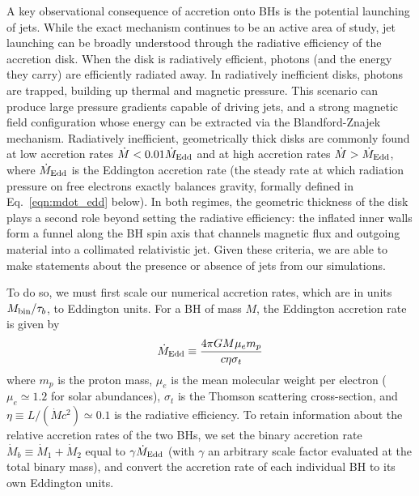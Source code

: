 \documentclass[fleqn,usenatbib]{mnras}
\begin{document}
A key observational consequence of accretion onto BHs is the potential launching of jets. While the exact mechanism continues to be an active area of study, jet launching can be broadly understood through the radiative efficiency of the accretion disk. When the disk is radiatively efficient, photons (and the energy they carry) are efficiently radiated away. In radiatively inefficient disks, photons are trapped, building up thermal and magnetic pressure. This scenario can produce large pressure gradients capable of driving jets, and a strong magnetic field configuration whose energy can be extracted via the Blandford-Znajek mechanism. Radiatively inefficient, geometrically thick disks are commonly found at low accretion rates $\dot{M} < 0.01 \dot{M}_{\rm Edd}$ \citep{Muryel_lowedd_jet_21} and at high accretion rates $\dot{M} > \dot{M}_{\rm Edd}$, where $\dot{M}_{\rm Edd}$ is the Eddington accretion rate (the steady rate at which radiation pressure on free electrons exactly balances gravity, formally defined in Eq.~\ref{eqn:mdot_edd} below). In both regimes, the geometric thickness of the disk plays a second role beyond setting the radiative efficiency: the inflated inner walls form a funnel along the BH spin axis that channels magnetic flux and outgoing material into a collimated relativistic jet. Given these criteria, we are able to make statements about the presence or absence of jets from our simulations.


To do so, we must first scale our numerical accretion rates, which are in units $M_{\rm{bin}}/\tau_b$, to Eddington units. For a BH of mass $M$, the Eddington accretion rate is given by
\begin{equation}\label{eqn:mdot_edd}
    \dot{M}_{\rm Edd} \equiv \frac{4\pi GM \mu_e m_p}{c \eta \sigma_t}
\end{equation}
where $m_p$ is the proton mass, $\mu_e$ is the mean molecular weight per electron ($\mu_e \simeq 1.2$ for solar abundances), $\sigma_t$ is the Thomson scattering cross-section, and $\eta \equiv L/(\dot{M}c^2) \simeq 0.1$ is the radiative efficiency. To retain information about the relative accretion rates of the two BHs, we set the binary accretion rate $\dot{M}_b \equiv \dot{M}_1 + \dot{M}_2$ equal to $\gamma \dot{M}_{\rm Edd}$ (with $\gamma$ an arbitrary scale factor evaluated at the total binary mass), and convert the accretion rate of each individual BH to its own Eddington units.
\end{document}
